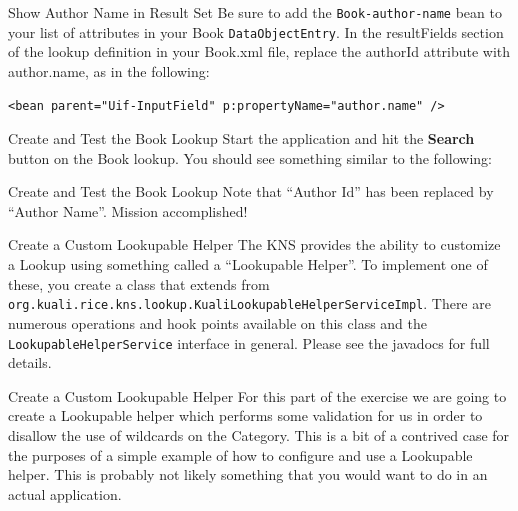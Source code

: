 \documentclass[xcolor=dvipsnames,14pt,professionalfonts]{beamer}
\begin{document}
\begin{frame}[fragile]{Show Author Name in Result Set}
 Be sure to add the \texttt{Book-author-name} bean to your list of attributes in your Book \texttt{DataObjectEntry}.
In the resultFields section of the lookup definition in your Book.xml file, replace the authorId attribute with author.name, as in the following:
    \begin{verbatim}
<bean parent="Uif-InputField" p:propertyName="author.name" />
    \end{verbatim}
\end{frame}

\begin{frame}{Create and Test the Book Lookup}
  Start the application and hit the \textbf{Search} button
  on the Book lookup.  You should see something similar
  to the following:
  \end{frame}

  \begin{frame}{Create and Test the Book Lookup}
    Note that “Author Id” has been replaced by “Author Name”.
      Mission accomplished!
  \end{frame}

  \begin{frame}{Create a Custom Lookupable Helper}
    The KNS provides the ability to customize a Lookup using something
    called a “Lookupable Helper”.  To implement one of these, you
    create a class that extends from
    \texttt{org.kuali.rice.kns.lookup.KualiLookupableHelperServiceImpl}.  There
    are numerous operations and hook points available on this class
    and the \texttt{LookupableHelperService} interface in general.  Please see
    the javadocs for full details.           
\end{frame}

  \begin{frame}{Create a Custom Lookupable Helper}
    For this part of the exercise we are going to create a Lookupable
    helper which performs some validation for us in order to disallow
    the use of wildcards on the Category.  This is a bit of a
    contrived case for the purposes of a simple example of how to
    configure and use a Lookupable helper.  This is probably not
    likely something that you would want to do in an actual
    application.
  \end{frame}
\end{document}
